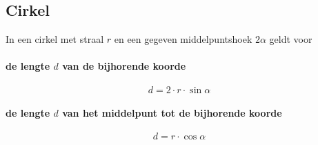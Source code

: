 \subsection{Cirkel}
 \label{sec:cirkel}
  In een cirkel met straal $r$ en een gegeven middelpuntshoek $2\alpha$ geldt voor\par
  
\paragraph{de lengte $d$ van de bijhorende koorde}
\label{sec:LengteKoordeCirkel}
   \[
	   d = 2 \cdot r \cdot \sin \alpha
   \]
  
\paragraph{de lengte $d$ van het middelpunt tot de bijhorende koorde}
\label{sec:AfstandMiddelpuntKoordeCirkel}
   \[
	   d = r \cdot \cos \alpha
   \]